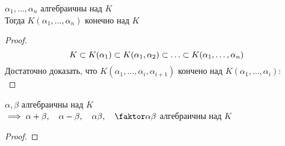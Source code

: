 \begin{implication}
	$ \alpha_1, \dots, \alpha_n $ алгебраичны над $ K $ \\
	Тогда $ K(\alpha_1, \dots, \alpha_n) $ конечно над $ K $
\end{implication}

\begin{proof}
	$$ K \sub K(\alpha_1) \sub K(\alpha_1, \alpha_2) \sub \dots \sub K(\alpha_1, \dots, \alpha_n) $$
	Достаточно доказать, что $ K(\alpha_1, \dots, \alpha_i, \alpha_{i + 1}) $ кончено над $ K(\alpha_1, \dots, \alpha_i) $: \\
	\widedots[5cm]
\end{proof}

\begin{implication}
	$ \alpha, \beta $ алгебраичны над $ K $ \\
	$ \implies \alpha + \beta, \quad \alpha - \beta, \quad \alpha \beta, \quad \faktor\alpha\beta $ алгебраичны над $ K $
\end{implication}

\begin{proof}
\end{proof}
